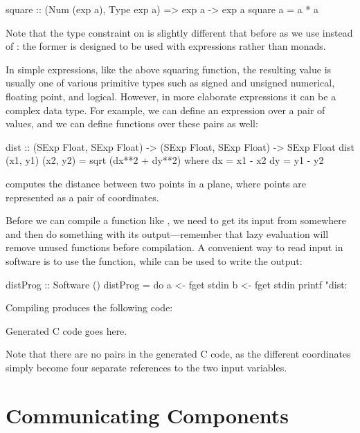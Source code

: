 \documentclass[../main.tex]{subfiles}
\begin{document}
\begin{code}
square :: (Num (exp a), Type exp a) => exp a -> exp a
square a = a * a
\end{code}

\noindent Note that the type constraint on  is slightly different that before as we use  instead of : the former is designed to be used with expressions rather than monads.

In simple expressions, like the above squaring function, the resulting value is usually one of various primitive types such as signed and unsigned numerical, floating point, and logical. However, in more elaborate expressions it can be a complex data type. For example, we can define an expression over a pair of values, and we can define functions over these pairs as well:

\begin{code}
dist :: (SExp Float, SExp Float) -> (SExp Float, SExp Float) -> SExp Float
dist (x1, y1) (x2, y2) = sqrt (dx**2 + dy**2)
  where
    dx = x1 - x2
    dy = y1 - y2
\end{code}

\noindent {} computes the distance between two points in a plane, where points are represented as a pair of coordinates.

Before we can compile a function like , we need to get its input from somewhere and then do something with its output---remember that lazy evaluation will remove unused functions before compilation. A convenient way to read input in software is to use the  function, while  can be used to write the output:

\begin{code}
distProg :: Software ()
distProg = do
  a <- fget stdin
  b <- fget stdin
  printf "dist: %
\end{code}

Compiling  produces the following code:

\begin{code}
Generated C code goes here.
\end{code}

\noindent Note that there are no pairs in the generated C code, as the different coordinates simply become four separate references to the two input variables.

\section{Communicating Components}
\end{document}
